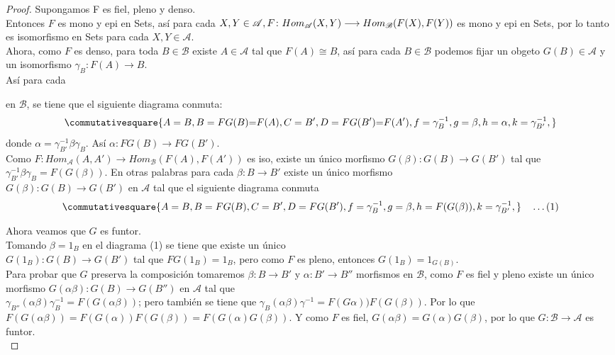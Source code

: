 \documentclass{article}
\begin{document}
\begin{enumerate}[label=\textbf{Ej \arabic*.}]
\begin{proof}
\boxed{\Leftarrow} Supongamos F es fiel, pleno y denso.\\
Entonces $F$ es mono y epi en Sets, así para cada
$X,Y\in \mathscr{A},\\ F\colon Hom_{\mathscr{A}}(X,Y)\longrightarrow Hom_{\mathscr{B}}(F(X),F(Y))$ es mono y epi en Sets, por lo tanto 
es isomorfismo en Sets para cada $X,Y\in \mathscr{A}$.\\
Ahora, como $F$ es denso, para toda $B\in \mathscr{B}$ existe $A\in \mathscr{A}$ tal que $F(A)\cong B$, así para cada $B\in \mathscr{B}$ podemos
fijar un obgeto $G(B)\in \mathscr{A}$ y un isomorfismo $\gamma_B\colon F(A)\longrightarrow B$.\\
Así para cada  en $\mathscr{B}$, se tiene que el siguiente diagrama conmuta:
\begin{equation*}
\commutativesquare{A=B,B=FG(B)\text{=}F(A),C=B',D=FG(B')\text{=}F(A'),f=\gamma^{-1}_B,g=\beta,h=\alpha,k=\gamma^{-1}_{B'},}
\end{equation*}
donde $\alpha=\gamma^{-1}_{B'} \beta \gamma_B$. Así $\alpha\colon FG(B)\longrightarrow FG(B')$.\\
Como $F\colon  Hom_{\mathscr{A}}(A,A')\longrightarrow Hom_{\mathscr{B}}(F(A),F(A'))$ es iso, existe un único morfismo $G(\beta)\colon
G(B)\longrightarrow G(B')$ tal que $\gamma^{-1}_{B'} \beta \gamma_B=F(G(\beta))$. En otras palabras para cada $\beta\colon B\longrightarrow B'$
existe un único morfismo \\ $G(\beta)\colon G(B)\longrightarrow G(B')$ en $\mathscr{A}$ tal que el siguiente diagrama conmuta
\begin{equation*}
\commutativesquare{A=B,B=FG(B),C=B',D=FG(B'),f=\gamma^{-1}_B,g=\beta,h=F(G(\beta)),k=\gamma^{-1}_{B'},}\quad\ldots (1)
\end{equation*}

Ahora veamos que $G$ es funtor.\\
Tomando $\beta=1_B$ en el diagrama (1) se tiene que existe un único \\ $G(1_B)\colon G(B)\longrightarrow G(B')$ tal que $FG(1_B)=1_B$, pero 
como $F$ es pleno, entonces $G(1_B)=1_{G(B)}$.\\
Para probar que $G$ preserva la composición tomaremos $\beta\colon B\longrightarrow B'$ y $\alpha\colon B'\longrightarrow B''$
 morfismos en $\mathscr{B}$, como $F$ es fiel y pleno existe 
un único morfismo $G(\alpha\beta)\colon G(B)\longrightarrow G(B'')$ en $\mathscr{A}$ tal que \\
$\gamma_{B''}(\alpha\beta)\gamma^{-1}_B=F(G(\alpha\beta))$; pero también se tiene que $\gamma_B(\alpha\beta)\gamma^{-1}
=F(G\alpha))F(G(\beta))$. Por lo que $F(G(\alpha\beta))=F(G(\alpha))F(G(\beta))=F(G(\alpha)G(\beta))$. Y como $F$ es fiel, $G(\alpha\beta)
=G(\alpha)G(\beta)$, por lo que $G\colon\mathscr{B}\longrightarrow\mathscr{A}$ es funtor.\\


\end{proof}
\end{enumerate}
\end{document}
